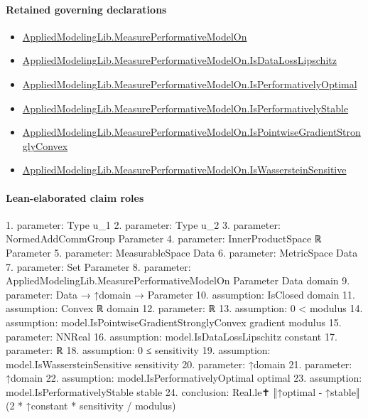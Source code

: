 \documentclass[10pt]{article}
\begin{document}
\paragraph{Retained governing declarations}
\begin{itemize}\raggedright
\item \hyperlink{library-prerequisite-e14cc5e8b1e1460e}{Applied\allowbreak{}Modeling\allowbreak{}Lib.\allowbreak{}Measure\allowbreak{}Performative\allowbreak{}Model\allowbreak{}On}
\item \hyperlink{library-prerequisite-0de79b655cc05174}{Applied\allowbreak{}Modeling\allowbreak{}Lib.\allowbreak{}Measure\allowbreak{}Performative\allowbreak{}Model\allowbreak{}On.\allowbreak{}Is\allowbreak{}Data\allowbreak{}Loss\allowbreak{}Lipschitz}
\item \hyperlink{library-prerequisite-555f831d5bfa2a27}{Applied\allowbreak{}Modeling\allowbreak{}Lib.\allowbreak{}Measure\allowbreak{}Performative\allowbreak{}Model\allowbreak{}On.\allowbreak{}Is\allowbreak{}Performatively\allowbreak{}Optimal}
\item \hyperlink{library-prerequisite-4af6c70f954a80a0}{Applied\allowbreak{}Modeling\allowbreak{}Lib.\allowbreak{}Measure\allowbreak{}Performative\allowbreak{}Model\allowbreak{}On.\allowbreak{}Is\allowbreak{}Performatively\allowbreak{}Stable}
\item \hyperlink{library-prerequisite-eb9ab8e4235e1d28}{Applied\allowbreak{}Modeling\allowbreak{}Lib.\allowbreak{}Measure\allowbreak{}Performative\allowbreak{}Model\allowbreak{}On.\allowbreak{}Is\allowbreak{}Pointwise\allowbreak{}Gradient\allowbreak{}Strongly\allowbreak{}Convex}
\item \hyperlink{library-prerequisite-0e1e192eee739a4b}{Applied\allowbreak{}Modeling\allowbreak{}Lib.\allowbreak{}Measure\allowbreak{}Performative\allowbreak{}Model\allowbreak{}On.\allowbreak{}Is\allowbreak{}Wasserstein\allowbreak{}Sensitive}
\end{itemize}
\paragraph{Lean-elaborated claim roles}\begin{ReviewVerbatim}
1. parameter: Type u_1
2. parameter: Type u_2
3. parameter: NormedAddCommGroup Parameter
4. parameter: InnerProductSpace ℝ Parameter
5. parameter: MeasurableSpace Data
6. parameter: MetricSpace Data
7. parameter: Set Parameter
8. parameter: AppliedModelingLib.MeasurePerformativeModelOn Parameter Data domain
9. parameter: Data → ↑domain → Parameter
10. assumption: IsClosed domain
11. assumption: Convex ℝ domain
12. parameter: ℝ
13. assumption: 0 < modulus
14. assumption: model.IsPointwiseGradientStronglyConvex gradient modulus
15. parameter: NNReal
16. assumption: model.IsDataLossLipschitz constant
17. parameter: ℝ
18. assumption: 0 ≤ sensitivity
19. assumption: model.IsWassersteinSensitive sensitivity
20. parameter: ↑domain
21. parameter: ↑domain
22. assumption: model.IsPerformativelyOptimal optimal
23. assumption: model.IsPerformativelyStable stable
24. conclusion: Real.le✝ ‖↑optimal - ↑stable‖ (2 * ↑constant * sensitivity / modulus)
\end{ReviewVerbatim}
\end{document}
